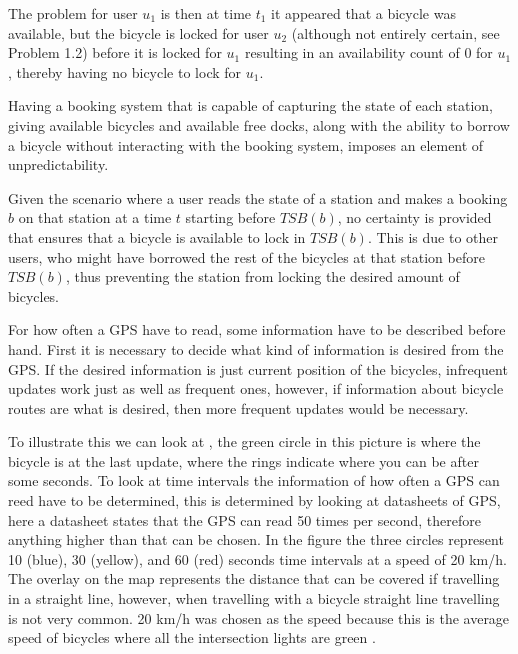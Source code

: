 \begin{description}[style=nextline]
The problem for user $u_1$ is then at time $t_1$ it appeared that a bicycle was available, but the bicycle is locked for user $u_2$ (although not entirely certain, see Problem 1.2) before it is locked for $u_1$ resulting in an availability count of 0 for $u_1$, thereby having no bicycle to lock for $u_1$.

\item[Problem 1.2] Having a booking system that is capable of capturing the state of each station, giving available bicycles and available free docks, along with the ability to borrow a bicycle without interacting with the booking system, imposes an element of unpredictability.

Given the scenario where a user reads the state of a station and makes a booking $b$ on that station at a time $t$ starting before $TSB(b)$, no certainty is provided that ensures that a bicycle is available to lock in $TSB(b)$. 
This is due to other users, who might have borrowed the rest of the bicycles at that station before $TSB(b)$, thus preventing the station from locking the desired amount of bicycles.

\item[Problem 1.3]
For how often a GPS have to read, some information have to be described before hand.
First it is necessary to decide what kind of information is desired from the GPS.
If the desired information is just current position of the bicycles, infrequent updates work just as well as frequent ones, however, if information about bicycle routes are what is desired, then more frequent updates would be necessary.

To illustrate this we can look at , the green circle in this picture is where the bicycle is at the last update, where the rings indicate where you can be after some seconds.
To look at time intervals the information of how often a GPS can reed have to be determined, this is determined by looking at datasheets of GPS, here a datasheet \citep{manual:gpsDataSheet} states that the GPS can read 50 times per second, therefore anything higher than that can be chosen.
In the figure the three circles represent 10 (blue), 30  (yellow), and 60 (red) seconds time intervals at a speed of 20 km/h.
The overlay on the map represents the distance that can be covered if travelling in a straight line, however, when travelling with a bicycle straight line travelling is not very common.
20 km/h was chosen as the speed because this is the average speed of bicycles where all the intersection lights are green \citep{misc:bicycleStatistics}.


\end{description}
